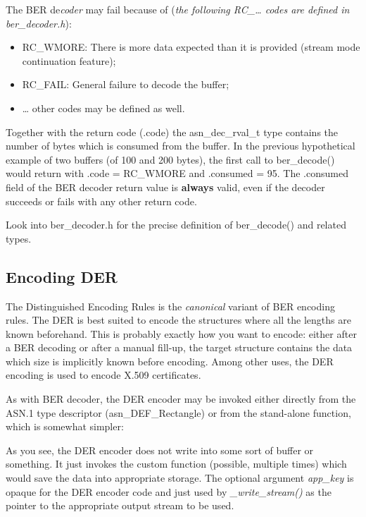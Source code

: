 \documentclass[english,oneside,12pt]{book}
\begin{document}
The BER de\emph{coder} may fail because of (\emph{the following RC\_\ldots{}
codes are defined in ber\_decoder.h}):
\begin{itemize}
\item RC\_WMORE: There is more data expected than it is provided (stream
mode continuation feature);
\item RC\_FAIL: General failure to decode the buffer;
\item \ldots{} other codes may be defined as well.
\end{itemize}
Together with the return code (.code) the asn\_dec\_rval\_t type contains
the number of bytes which is consumed from the buffer. In the previous
hypothetical example of two buffers (of 100 and 200 bytes), the first
call to ber\_decode() would return with .code = RC\_WMORE and .consumed
= 95. The .consumed field of the BER decoder return value is \textbf{always}
valid, even if the decoder succeeds or fails with any other return
code.

Look into ber\_decoder.h for the precise definition of ber\_decode()
and related types.


\subsection{\label{sub:Encoding-DER}Encoding DER}

The Distinguished Encoding Rules is the \emph{canonical} variant of
BER encoding rules. The DER is best suited to encode the structures
where all the lengths are known beforehand. This is probably exactly
how you want to encode: either after a BER decoding or after a manual
fill-up, the target structure contains the data which size is implicitly
known before encoding. Among other uses, the DER encoding is used
to encode X.509 certificates.

As with BER decoder, the DER encoder may be invoked either directly
from the ASN.1 type descriptor (asn\_DEF\_Rectangle) or from the stand-alone
function, which is somewhat simpler:
As you see, the DER encoder does not write into some sort of buffer
or something. It just invokes the custom function (possible, multiple
times) which would save the data into appropriate storage. The optional
argument \emph{app\_key} is opaque for the DER encoder code and just
used by \emph{\_write\_stream()} as the pointer to the appropriate
output stream to be used.
\end{document}
